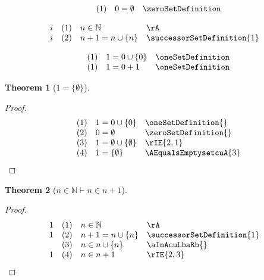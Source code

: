 \documentclass{book}
\theoremstyle{plain}
\newtheorem{theorem}{Theorem}
\theoremstyle{remark}
\theoremstyle{definition}
\begin{document}
\[
\begin{array}{llll}
	& (1) & 0 = \emptyset & \zeroSetDefinition \\
\end{array}
\]

\[
\begin{array}{llll}
	i & (1) & n \in \mathbb{N} & \rA \\
	i & (2) & n + 1 = n \cup \{n\} & \successorSetDefinition{1} \\
\end{array}
\]

\[
\begin{array}{llll}
	& (1) & 1 = 0 \cup \{0\} & \oneSetDefinition \\
 	& (1) & 1 = 0+1 & \oneSetDefinition \\
\end{array}
\]


\label{OneEqualsLbEmptysetRb}
\begin{theorem}[\(1=\{\emptyset\}\)]
\end{theorem}
\begin{proof}
	\[
	\begin{array}{llll}
		      & (1) & 1=0\cup\{0\} & \oneSetDefinition{}\\
		    & (2) & 0=\emptyset  & \zeroSetDefinition{}\\
		    & (3) & 1=\emptyset\cup\{\emptyset\} & \rIE{2,1} \\		
            & (4) & 1=\{\emptyset\} & \AEqualsEmptysetcuA{3} \\		
	\end{array}
	\]
\end{proof}

\label{nInNaturalImpnInnPlusOne}
\begin{theorem}[\(n\in\mathbb{N}\vdash n\in n+1\)]
\end{theorem}
\begin{proof}
	\[
	\begin{array}{llll}
		  1   & (1) & n\in\mathbb{N} & \rA\\
		1   & (2) & n+1=n\cup\{n\}  & \successorSetDefinition{1}\\
            & (3) & n\in n\cup\{n\}  & \aInAcuLbaRb{}\\
        1   & (4) & n\in n+1  & \rIE{2,3}
	\end{array}
	\]
\end{proof}
\end{document}
